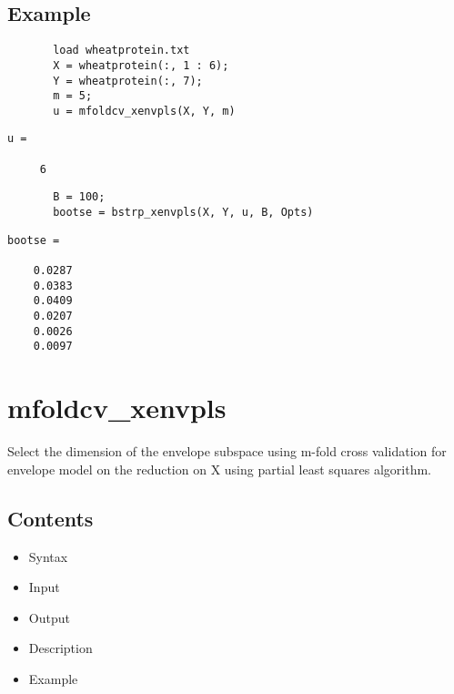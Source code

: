 \documentclass[a4paper,11pt,openany]{memoir}
\begin{document}
\subsection*{Example}


\begin{verbatim}       load wheatprotein.txt
       X = wheatprotein(:, 1 : 6);
       Y = wheatprotein(:, 7);
       m = 5;
       u = mfoldcv_xenvpls(X, Y, m)\end{verbatim}
               \color{lightgray} \ttfamily\begin{verbatim}
u =

     6
     \end{verbatim} \rmfamily
     \color{black}
\begin{verbatim}       B = 100;
       bootse = bstrp_xenvpls(X, Y, u, B, Opts)\end{verbatim}
    
        \color{lightgray} \ttfamily\begin{verbatim}
bootse =

    0.0287
    0.0383
    0.0409
    0.0207
    0.0026
    0.0097

\end{verbatim} \rmfamily\color{black}

\newpage
\rmfamily
\color{black}\section{mfoldcv\_xenvpls}

\begin{par}
Select the dimension of the envelope subspace using m-fold cross validation for envelope model on the reduction on X using partial least squares algorithm.
\end{par} \vspace{1em}

\subsection*{Contents}

\begin{itemize}
\setlength{\itemsep}{-1ex}
   \item Syntax
   \item Input
   \item Output
   \item Description
   \item Example
\end{itemize}
\end{document}
